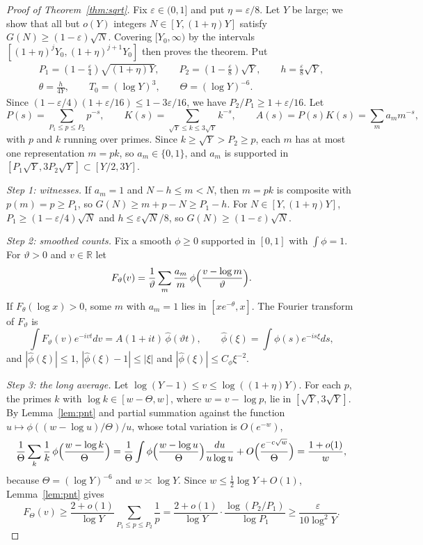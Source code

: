 \documentclass[11pt,letterpaper]{article}
\theoremstyle{remark}
\begin{document}
\begin{proof}[Proof of Theorem~\ref{thm:sqrt}]
Fix $\varepsilon\in(0,1]$ and put $\eta=\varepsilon/8$. Let $Y$ be large; we
show that all but $o(Y)$ integers $N\in[Y,(1+\eta)Y]$ satisfy
$G(N)\ge(1-\varepsilon)\sqrt N$. Covering $[Y_0,\infty)$ by the intervals
$[(1+\eta)^jY_0,(1+\eta)^{j+1}Y_0]$ then proves the theorem. Put
\begin{gather*}
P_1=(1-\tfrac{\varepsilon}4)\sqrt{(1+\eta)Y},\qquad P_2=(1-\tfrac{\varepsilon}8)\sqrt Y,\qquad
h=\tfrac{\varepsilon}{8}\sqrt Y,\\
\theta=\frac{h}{4Y},\qquad T_0=(\log Y)^3,\qquad \Theta=(\log Y)^{-6}.
\end{gather*}
Since $(1-\varepsilon/4)(1+\varepsilon/16)\le 1-3\varepsilon/16$, we have
$P_2/P_1\ge 1+\varepsilon/16$. Let
\[
P(s)=\sum_{P_1\le p\le P_2}p^{-s},\qquad K(s)=\sum_{\sqrt Y\le k\le 3\sqrt Y}k^{-s},
\qquad A(s)=P(s)K(s)=\sum_m a_mm^{-s},
\]
with $p$ and $k$ running over primes. Since $k\ge\sqrt Y>P_2\ge p$, each $m$ has
at most one representation $m=pk$, so $a_m\in\{0,1\}$, and $a_m$ is supported in
$[P_1\sqrt Y,3P_2\sqrt Y]\subset[Y/2,3Y]$.

\emph{Step 1: witnesses.} If $a_m=1$ and $N-h\le m<N$, then $m=pk$ is composite
with $p(m)=p\ge P_1$, so $G(N)\ge m+p-N\ge P_1-h$. For $N\in[Y,(1+\eta)Y]$,
$P_1\ge(1-\varepsilon/4)\sqrt N$ and $h\le\varepsilon\sqrt N/8$, so
$G(N)\ge(1-\varepsilon)\sqrt N$.

\emph{Step 2: smoothed counts.} Fix a smooth $\phi\ge0$ supported in $[0,1]$
with $\int\phi=1$. For $\vartheta>0$ and $v\in\mathbb R$ let
\[
F_\vartheta(v)=\frac1\vartheta\sum_m\frac{a_m}{m}\,\phi\Bigl(\frac{v-\log m}{\vartheta}\Bigr).
\]
If $F_\theta(\log x)>0$, some $m$ with $a_m=1$ lies in $[xe^{-\theta},x]$. The
Fourier transform of $F_\vartheta$ is
\[
\int F_\vartheta(v)e^{-ivt}dv=A(1+it)\,\hat\phi(\vartheta t),\qquad
\hat\phi(\xi)=\int\phi(s)e^{-is\xi}ds,
\]
and $|\hat\phi(\xi)|\le1$, $|\hat\phi(\xi)-1|\le|\xi|$ and
$|\hat\phi(\xi)|\le C_\phi\xi^{-2}$.

\emph{Step 3: the long average.} Let $\log(Y-1)\le v\le\log((1+\eta)Y)$. For
each $p$, the primes $k$ with $\log k\in[w-\Theta,w]$, where $w=v-\log p$, lie in
$[\sqrt Y,3\sqrt Y]$. By Lemma~\ref{lem:pnt} and partial summation against the
function $u\mapsto\phi((w-\log u)/\Theta)/u$, whose total variation is
$O(e^{-w})$,
\[
\frac1\Theta\sum_k\frac1k\,\phi\Bigl(\frac{w-\log k}{\Theta}\Bigr)
=\frac1\Theta\int\phi\Bigl(\frac{w-\log u}{\Theta}\Bigr)\frac{du}{u\log u}+O\Bigl(\frac{e^{-c\sqrt w}}{\Theta}\Bigr)
=\frac{1+o(1)}{w},
\]
because $\Theta=(\log Y)^{-6}$ and $w\asymp\log Y$. Since
$w\le\frac12\log Y+O(1)$, Lemma~\ref{lem:pnt} gives
\[
F_\Theta(v)\ge\frac{2+o(1)}{\log Y}\sum_{P_1\le p\le P_2}\frac1p
=\frac{2+o(1)}{\log Y}\cdot\frac{\log(P_2/P_1)}{\log P_1}\ge\frac{\varepsilon}{10\log^2Y}.
\]


\end{proof}
\end{document}
